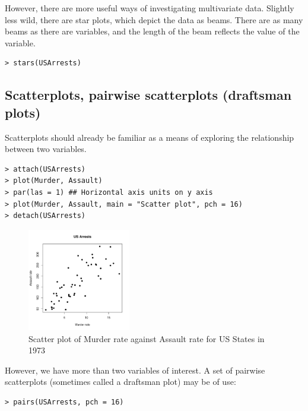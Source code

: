 However, there are more useful ways of investigating multivariate data.   Slightly less wild, there are star plots, which depict the data as beams.   There are as many beams as there are variables, and the length of the beam reflects the value of the variable.

\singlespacing
\begin{verbatim}
> stars(USArrests)
\end{verbatim}
\onehalfspacing


\subsection{Scatterplots, pairwise scatterplots (draftsman plots)}

Scatterplots should already be familiar as a means of exploring the relationship between two variables.

\singlespacing
\begin{verbatim}
> attach(USArrests)
> plot(Murder, Assault)
> par(las = 1) ## Horizontal axis units on y axis
> plot(Murder, Assault, main = "Scatter plot", pch = 16) 
> detach(USArrests)
\end{verbatim}
\onehalfspacing

\begin{figure}
\begin{center}
\includegraphics[width = 0.4\textwidth]{images/scatter}
\caption{Scatter plot of Murder rate against Assault rate for US States in 1973}
\end{center}
\end{figure}


However, we have more than two variables of interest.   A set of pairwise scatterplots (sometimes called a draftsman plot) may be of use:

\singlespacing
\begin{verbatim}
> pairs(USArrests, pch = 16)
\end{verbatim}
\onehalfspacing

